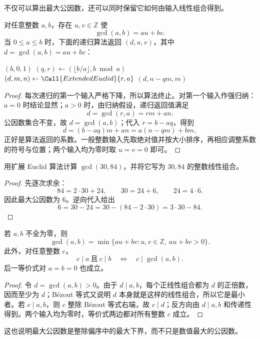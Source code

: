 \documentclass[lang=cn,a4paper,fontset=none,zihao=false,10pt,openany,twoside]{beautybook}
\numberwithin{algorithm}{chapter}
\begin{document}
不仅可以算出最大公因数，还可以同时保留它如何由输入线性组合得到。
\begin{theorem}\label{thm:bezout}
对任意整数 $a,b$，存在 $u,v\in\mathbb Z$ 使
\[
 \gcd(a,b)=au+bv.
\]
当 $0\le a\le b$ 时，下面的递归算法返回 $(d,u,v)$，其中 $d=\gcd(a,b)=au+bv$：
\begin{algorithmic}[1]
  \State \Return $(b,0,1)$
 \EndIf
 \State $(q,r)\gets(\lfloor b/a\rfloor,b\bmod a)$
 \State $(d,m,n)\gets\Call{ExtendedEuclid}{r,a}$
 \State \Return $(d,n-qm,m)$
\EndFunction
\end{algorithmic}
\end{theorem}
\begin{proof}
每次递归的第一个输入严格下降，所以算法终止。对第一个输入作强归纳：$a=0$ 时结论显然；$a>0$ 时，由归纳假设，递归返回值满足
\[
 d=\gcd(r,a)=rm+an.
\]
公因数集合不变，故 $d=\gcd(a,b)$；代入 $r=b-aq$，得到
\[
 d=(b-aq)m+an=a(n-qm)+bm,
\]
正好是算法返回的系数。一般整数输入先取绝对值并按大小排序，再相应调整系数的符号与位置；两个输入均为零时取 $u=v=0$ 即可。
\end{proof}

\begin{example}
用扩展 Euclid 算法计算 $\gcd(30,84)$，并将它写为 $30,84$ 的整数线性组合。
\end{example}
\begin{proof}
先逐次求余：
\[
 84=2\cdot30+24,\qquad30=24+6,\qquad24=4\cdot6.
\]
因此最大公因数为 $6$。逆向代入给出
\[
 6=30-24=30-(84-2\cdot30)=3\cdot30-84.
\]
\end{proof}

\begin{corollary}[最大公因数的两种刻画]\label{cor:gcd-characterization}
若 $a,b$ 不全为零，则
\[
 \gcd(a,b)=\min\{au+bv:u,v\in\mathbb Z,\ au+bv>0\}.
\]
此外，对任意整数 $c$，
\[
 c\mid a\ \text{且}\ c\mid b\quad\Longleftrightarrow\quad c\mid\gcd(a,b).
\]
后一等价式对 $a=b=0$ 也成立。
\end{corollary}
\begin{proof}
令 $d=\gcd(a,b)>0$。由于 $d\mid a,b$，每个正线性组合都为 $d$ 的正倍数，因而至少为 $d$；Bézout 等式又说明 $d$ 本身就是这样的线性组合，所以它是最小者。若 $c\mid a,b$，则 $c$ 整除 Bézout 等式右端，故 $c\mid d$；反方向由 $d\mid a,b$ 和传递性得到。两个输入均为零时，等价式两边都对所有整数 $c$ 成立。
\end{proof}
这也说明最大公因数是整除偏序中的最大下界，而不只是数值最大的公因数。
\end{document}

